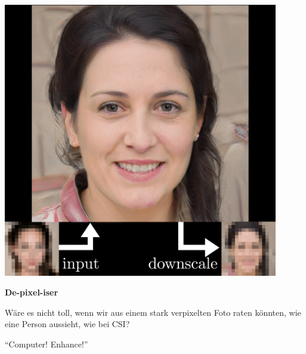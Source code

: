 \documentclass[aspectratio=169,usenames,dvipsnames]{beamer}
\begin{document}
\begin{frame}
\begin{minipage}{.5\textwidth}
\includegraphics[width=0.9\textwidth, keepaspectratio]{images/step2}
\end{minipage}\begin{minipage}{.5\textwidth}
\textbf{De-pixel-iser}
\bigskip

Wäre es nicht toll, wenn wir aus einem stark verpixelten Foto raten könnten, wie eine Person aussieht, wie bei CSI?
\bigskip

``Computer! Enhance!''
\end{minipage}
\end{frame}
\end{document}
